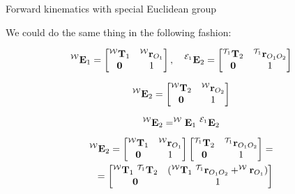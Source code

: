 \documentclass{beamer}
\begin{document}
\begin{frame}{Forward kinematics with special Euclidean group}
	\begin{flushleft}
		
		We could do the same thing in the following fashion:
		
		\begin{equation}
			^{\mathcal W}\bo{E}_1 = 
			\begin{bmatrix}
				^{\mathcal W}\mathbf T_1 & ^{\mathcal W}\bo{r}_{O_1} \\
				\bo{0} & 1
			\end{bmatrix},  
		\ \ \ 
			^{\mathcal E_1}\bo{E}_2 = 
			\begin{bmatrix}
				^{\mathcal T_1}\mathbf T_2 & ^{\mathcal T_1}\bo{r}_{O_1 O_2} \\
				\bo{0} & 1
			\end{bmatrix}
		\end{equation}		
		
		\begin{equation}
			^{\mathcal W}\mathbf{E}_2 = 
			\begin{bmatrix}
				^{\mathcal W}\mathbf T_2 & ^{\mathcal W}\mathbf{r}_{O_2} \\
				\mathbf{0} & 1
			\end{bmatrix}
		\end{equation}
		
		\begin{equation}
			^{\mathcal W}\mathbf{E}_2 = 
			^{\mathcal W}\mathbf{E}_1 \ ^{\mathcal E_1}\mathbf{E}_2
		\end{equation}
		
		\begin{align*}
			^{\mathcal W}\mathbf{E}_2 = 
			\begin{bmatrix}
				^{\mathcal W}\mathbf T_1 & ^{\mathcal W}\mathbf{r}_{O_1} \\
				\mathbf{0} & 1
			\end{bmatrix} 
			\begin{bmatrix}
	^{\mathcal T_1}\mathbf T_2 & ^{\mathcal T_1}\mathbf{r}_{O_1 O_2} \\
	\mathbf{0} & 1
			\end{bmatrix}
	= \\
	=
			\begin{bmatrix}
		^{\mathcal W}\mathbf T_1 \ ^{\mathcal T_1}\mathbf T_2 & 
		(^{\mathcal W}\mathbf T_1 \ ^{\mathcal T_1}\mathbf{r}_{O_1 O_2} + ^{\mathcal W}\mathbf{r}_{O_1})
		\\
		\mathbf{0} & 1
			\end{bmatrix}
		\end{align*}
		
	\end{flushleft}
\end{frame}
\end{document}
